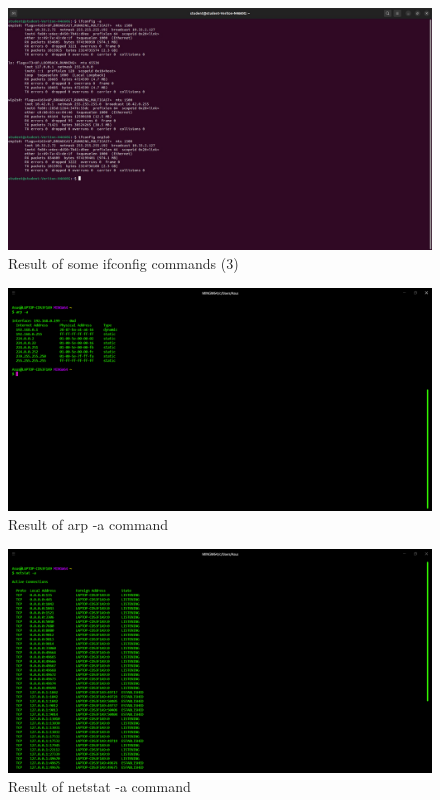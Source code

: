 \documentclass[11pt]{article}
\begin{document}
\begin{figure}
    \centering
    \includegraphics[width=\textwidth]{ifconfig 7.jpg}
    \caption{Result of some ifconfig commands (3)}  
\end{figure}

\begin{figure}
    \centering
    \includegraphics[width=\textwidth]{arp 1.png}
    \caption{Result of arp -a command}  
\end{figure}

\begin{figure}
    \centering
    \includegraphics[width=\textwidth]{netstat 1.png}
    \caption{Result of netstat -a command}  
\end{figure}
\end{document}
